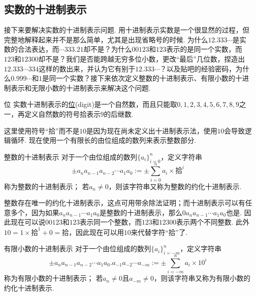 \documentclass[main.tex]{subfiles}
\begin{document}
\subsection{实数的十进制表示}

接下来要解决实数的十进制表示问题. 用十进制表示实数是一个很显然的过程，但完整地解释起来并不是那么简单，尤其是出现省略号的时候. 为什么\(12.333\cdots\)是实数的合法表达，而\(\cdots333.21\)却不是？为什么\(00123\)和\(123\)表示的是同一个实数，而\(123\)和\(12300\)却不是？我们是否能跨越无穷多位小数，更改“最后”几位数，捏造出\(12.333\cdots334\)这样的数出来，并认为它有别于\(12.333\cdots\)？以及贴吧的经验密码，为什么\(0.999\cdots\)和\(1\)是同一个实数？接下来依次定义整数的十进制表示、有限小数的十进制表示和无限小数的十进制表示来解决这个问题.

\begin{definition}{位}
    实数十进制表示的\uline{位}(digit)是一个自然数，而且只能取\(0,1,2,3,4,5,6,7,8,9\)之一，再定义自然数的符号\(\mbox{拾}\)表示\(9\)的后继数.
\end{definition}

这里使用符号“拾”而不是\(10\)是因为现在尚未定义出十进制表示法，使用\(10\)会导致逻辑循环. 现在使用一个有限长的由位组成的数列来表示整数部分.

\begin{definition}{整数的十进制表示}
    对于一个由位组成的数列\(\{a_i\}_{i=0}^n\)，定义字符串
    \[\pm a_n a_{n-1} a_{n-2} \cdots a_1 a_0 := \pm \sum_{i=0}^{n} a_i \times \mbox{拾}^i\]
    称为整数的十进制表示；
    \newline
    若\(a_n \neq 0\)，则该字符串又称为整数的约化十进制表示.
\end{definition}

整数存在唯一的约化十进制表示，这点可用带余除法证明；而十进制表示可以有任意多个，因为如果\(a_n a_{n-1}\cdots a_1 a_0\)是整数的十进制表示，那么\(0a_n a_{n-1}\cdots a_1 a_0\)也是. 因此现在可以说\(00123\)和\(123\)表示同一个整数，而\(123\)和\(12300\)表示两个不同整数. 此外\(10=1 \times \mbox{拾}^1+0=\mbox{拾}\)，因此现在可以用\(10\)来代替字符“拾”了.

\begin{definition}{有限小数的十进制表示}
    对于一个由位组成的数列\(\{a_i\}_{i=-m}^n\)，定义字符串
    \[\pm a_n a_{n-1} a_{n-2} \cdots a_1 a_0.a_{-1} a_{-2} \cdots a_{-m}:= \pm \sum_{i=-m}^{n} a_i \times 10^i\]
    称为有限小数的十进制表示；
    \newline
    若\(a_n \neq 0\)且\(a_{-m} \neq 0\)，则该字符串又称为有限小数的约化十进制表示.
\end{definition}
\end{document}
